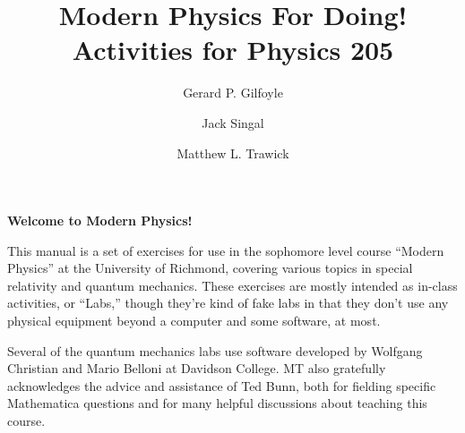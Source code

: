 

\title{Modern Physics For Doing!\\
Activities for Physics 205}

\author{Gerard P. Gilfoyle}
\author{Jack Singal}
\author{Matthew L. Trawick}

\maketitle

\vspace{0.8 in}


\begin{center}
\large{\textbf{Welcome to Modern Physics!}}
\end{center}


This manual is a set of exercises for use in the sophomore level course ``Modern Physics'' at the University of Richmond, covering various topics in special relativity and quantum mechanics.  These exercises are mostly intended as in-class activities, or ``Labs,'' though they're kind of fake labs in that they don't use any physical equipment beyond a computer and some software, at most.

Several of the quantum mechanics labs use software developed by Wolfgang Christian and Mario Belloni at Davidson College.  MT also gratefully acknowledges the advice and assistance of Ted Bunn, both for fielding specific Mathematica questions and for many helpful discussions about teaching this course.



\newpage
\
\thispagestyle{plain}

\newpage
\
